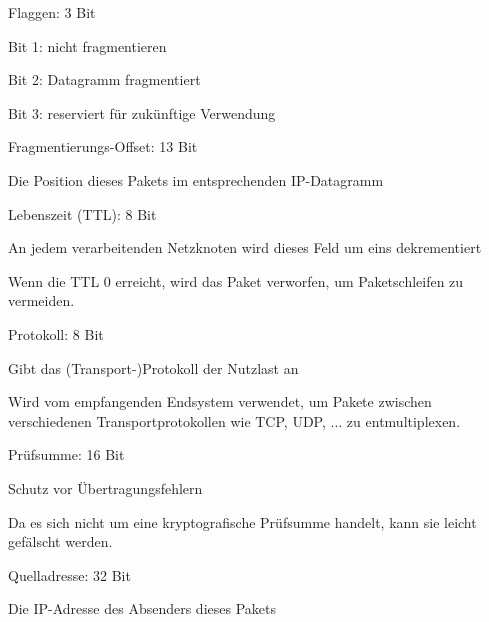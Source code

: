 \documentclass[a4paper]{article}
\begin{document}
\begin{multicols}{3}
\begin{itemize*}
            \item Flaggen: 3 Bit
            \begin{itemize*}
                  \item Bit 1: nicht fragmentieren
                  \item Bit 2: Datagramm fragmentiert
                  \item Bit 3: reserviert für zukünftige Verwendung
            \end{itemize*}
            \item Fragmentierungs-Offset: 13 Bit
            \begin{itemize*}
                  \item Die Position dieses Pakets im entsprechenden IP-Datagramm
            \end{itemize*}
            \item Lebenszeit (TTL): 8 Bit
            \begin{itemize*}
                  \item An jedem verarbeitenden Netzknoten wird dieses Feld um eins dekrementiert
                  \item Wenn die TTL 0 erreicht, wird das Paket verworfen, um Paketschleifen zu vermeiden.
            \end{itemize*}
            \item Protokoll: 8 Bit
            \begin{itemize*}
                  \item Gibt das (Transport-)Protokoll der Nutzlast an
                  \item Wird vom empfangenden Endsystem verwendet, um Pakete zwischen verschiedenen Transportprotokollen wie TCP, UDP, ... zu entmultiplexen.
            \end{itemize*}
            \item Prüfsumme: 16 Bit
            \begin{itemize*}
                  \item Schutz vor Übertragungsfehlern
                  \item Da es sich nicht um eine kryptografische Prüfsumme handelt, kann sie leicht gefälscht werden.
            \end{itemize*}
            \item Quelladresse: 32 Bit
            \begin{itemize*}
                  \item Die IP-Adresse des Absenders dieses Pakets
            \end{itemize*}

\end{itemize*}
\end{multicols}
\end{document}
